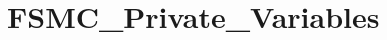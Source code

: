 \hypertarget{group___f_s_m_c___private___variables}{}\section{F\+S\+M\+C\+\_\+\+Private\+\_\+\+Variables}
\label{group___f_s_m_c___private___variables}

